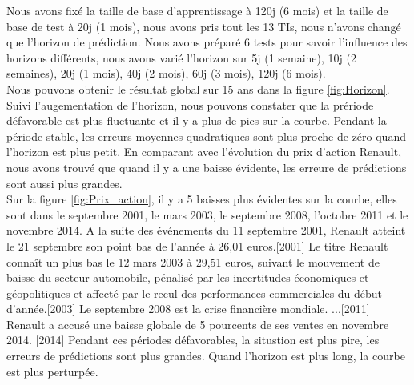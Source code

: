 Nous avons fixé la taille de base d'apprentissage à 120j (6 mois) et la taille de base de test à 20j (1 mois), nous avons pris tout les 13 TIs, nous n'avons changé que l'horizon de prédiction. Nous avons préparé 6 tests pour savoir l'influence des horizons différents, nous avons varié l'horizon sur 5j (1 semaine), 10j (2 semaines), 20j (1 mois), 40j (2 mois), 60j (3 mois), 120j (6 mois). \\

Nous pouvons obtenir le résultat global sur 15 ans dans la figure \ref{fig:Horizon}. Suivi l'augementation de l'horizon, nous pouvons constater que la prériode défavorable est plus fluctuante et il y a plus de pics sur la courbe. Pendant la période stable, les erreurs moyennes quadratiques sont plus proche de zéro quand l'horizon est plus petit. En comparant avec l'évolution du prix d'action Renault, nous avons trouvé que quand il y a une baisse évidente, les erreure de prédictions sont aussi plus grandes. \\

Sur la figure \ref{fig:Prix_action}, il y a 5 baisses plus évidentes sur la courbe, elles sont dans le septembre 2001, le mars 2003, le septembre 2008, l'octobre 2011 et le novembre 2014. A la suite des événements du 11 septembre 2001, Renault atteint le 21 septembre son point bas de l'année à 26,01 euros.[2001] Le titre Renault connaît un plus bas le 12 mars 2003 à 29,51 euros, suivant le mouvement de baisse du secteur automobile, pénalisé par les incertitudes économiques et géopolitiques et affecté par le recul des performances commerciales du début d’année.[2003] Le septembre 2008 est la crise financière mondiale. ...[2011] Renault a accusé une baisse globale de 5 pourcents de ses ventes en novembre 2014. [2014] Pendant ces périodes défavorables, la situstion est plus pire, les erreurs de prédictions sont plus grandes. Quand l'horizon est plus long, la courbe est plus perturpée. \\ 



